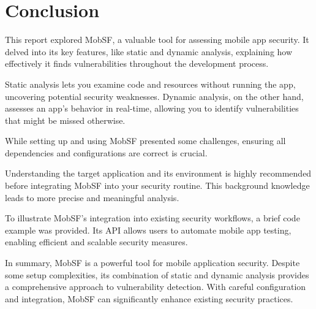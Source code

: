 \documentclass{report}
\begin{document}
\chapter{Conclusion}
This report explored MobSF, a valuable tool for assessing mobile app security. It delved into its key features, like static and dynamic analysis, explaining how effectively it finds vulnerabilities throughout the development process.

Static analysis lets you examine code and resources without running the app, uncovering potential security weaknesses. Dynamic analysis, on the other hand, assesses an app's behavior in real-time, allowing you to identify vulnerabilities that might be missed otherwise.

While setting up and using MobSF presented some challenges, ensuring all dependencies and configurations are correct is crucial.

Understanding the target application and its environment is highly recommended before integrating MobSF into your security routine. This background knowledge leads to more precise and meaningful analysis.

To illustrate MobSF's integration into existing security workflows, a brief code example was provided. Its API allows users to automate mobile app testing, enabling efficient and scalable security measures.

In summary, MobSF is a powerful tool for mobile application security. Despite some setup complexities, its combination of static and dynamic analysis provides a comprehensive approach to vulnerability detection. With careful configuration and integration, MobSF can significantly enhance existing security practices.
\end{document}
